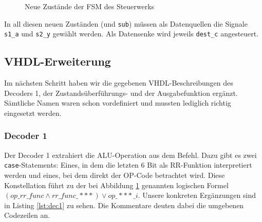 \documentclass[12pt,a4paper]{scrartcl}
\begin{document}
\begin{figure}
    \label{fig:fsm}
    \caption{Neue Zust\"ande der FSM des Steuerwerks}
\end{figure}

In all diesen neuen Zust\"anden (und \texttt{sub}) m\"ussen als Datenquellen die Signale \texttt{s1\_a} und \texttt{s2\_y} gew\"ahlt werden.
Als Datensenke wird jeweils \texttt{dest\_c} angesteuert.

\subsection*{VHDL-Erweiterung}
Im n\"achsten Schritt haben wir die gegebenen VHDL-Beschreibungen des Decoders 1, der Zustands\"uberf\"uhrungs- und der Ausgabefunktion erg\"anzt.
S\"amtliche Namen waren schon vordefiniert und mussten lediglich richtig eingesetzt werden.

\subsubsection*{Decoder 1}
Der Decoder 1 extrahiert die ALU-Operation aus dem Befehl.
Dazu gibt es zwei \texttt{case}-Statements:
Eines, in dem die letzten 6 Bit als RR-Funktion interpretiert werden und eines, bei dem direkt der OP-Code betrachtet wird.
Diese Konstellation f\"uhrt zu der bei Abbildung \ref{fig:fsm} genannten logischen Formel $(op\_rr\_func \wedge rr\_func\_***) \vee op\_***\_i$.
Unsere konkreten Erg\"anzungen sind in Listing \ref{lst:dec1} zu sehen.
Die Kommentare deuten dabei die umgebenen Codezeilen an.

\end{document}
